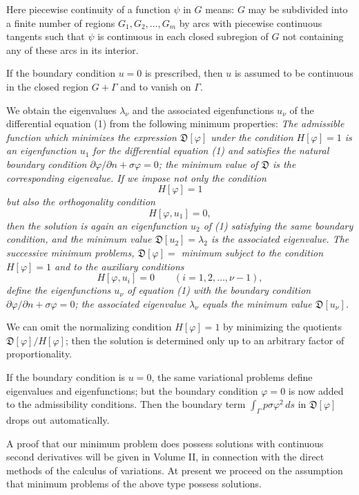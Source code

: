 Here piecewise continuity of a function $\psi$ in $G$ means: $G$ may be subdivided into a finite number of regions $G_1,G_2,\ldots,G_m$ by arcs with piecewise continuous tangents such that $\psi$ is continuous in each closed subregion of $G$ not containing any of these arcs in its interior.

If the boundary condition $u=0$ is prescribed, then $u$ is assumed to be continuous in the closed region $G+\Gamma$ and to vanish on $\Gamma$.

We obtain the eigenvalues $\lambda_\nu$ and the associated eigenfunctions $u_\nu$ of the differential equation (1) from the following minimum properties: \emph{The admissible function which minimizes the expression $\mathfrak D[\varphi]$ under the condition $H[\varphi]=1$ is an eigenfunction $u_1$ for the differential equation (1) and satisfies the natural boundary condition $\partial\varphi/\partial n+\sigma\varphi=0$; the minimum value of $\mathfrak D$ is the corresponding eigenvalue. If we impose not only the condition}
\begin{equation}\tag{3a}
H[\varphi]=1
\end{equation}
\emph{but also the orthogonality condition}
\[
H[\varphi,u_1]=0,
\]
\emph{then the solution is again an eigenfunction $u_2$ of (1) satisfying the same boundary condition, and the minimum value $\mathfrak D[u_2]=\lambda_2$ is the associated eigenvalue. The successive minimum problems, $\mathfrak D[\varphi]=$ minimum subject to the condition $H[\varphi]=1$ and to the auxiliary conditions}
\[
H[\varphi,u_i]=0\qquad(i=1,2,\ldots,\nu-1),
\]
\emph{define the eigenfunctions $u_\nu$ of equation (1) with the boundary condition $\partial\varphi/\partial n+\sigma\varphi=0$; the associated eigenvalue $\lambda_\nu$ equals the minimum value $\mathfrak D[u_\nu]$.}

We can omit the normalizing condition $H[\varphi]=1$ by minimizing the quotients $\mathfrak D[\varphi]/H[\varphi]$; then the solution is determined only up to an arbitrary factor of proportionality.

If the boundary condition is $u=0$, the same variational problems define eigenvalues and eigenfunctions; but the boundary condition $\varphi=0$ is now added to the admissibility conditions. Then the boundary term $\int_\Gamma p\sigma\varphi^2\,ds$ in $\mathfrak D[\varphi]$ drops out automatically.

A proof that our minimum problem does possess solutions with continuous second derivatives will be given in Volume II, in connection with the direct methods of the calculus of variations. At present we proceed on the assumption that minimum problems of the above type possess solutions.

